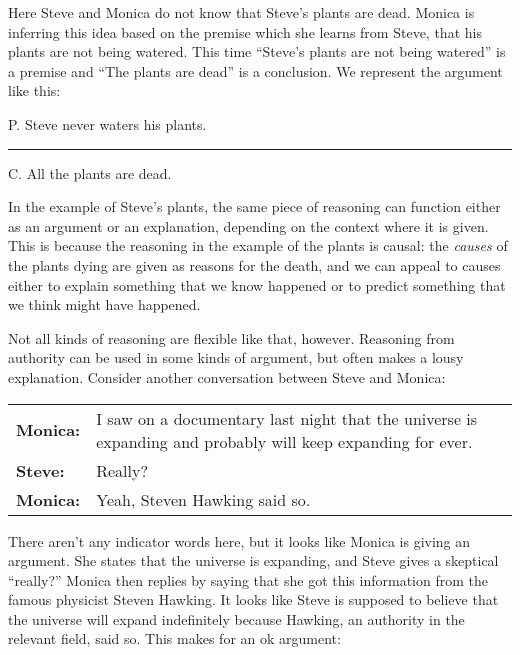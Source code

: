{Here Steve and Monica do not know that Steve's plants are dead. Monica is inferring this idea based on the premise which she learns from Steve, that his plants are not being watered. This time ``Steve's plants are not being watered'' is a premise and ``The plants are dead'' is a conclusion. We represent the argument like this:

\begin{earg}
\item[P.] Steve never waters his plants. 
\vspace{-.5em}
\item [] \rule{0.3\linewidth}{.5pt} 
\item[C.] All the plants are dead. 
\end{earg}

In the example of Steve's plants, the same piece of reasoning can function either as an argument or an explanation, depending on the context where it is given. This is because the reasoning in the example of the plants is causal: the \textit{causes} of the plants dying are given as reasons for the death, and we can appeal to causes either to explain something that we know happened or to predict something that we think might have happened. 

Not all kinds of reasoning are flexible like that, however. Reasoning from authority can be used in some kinds of argument, but often makes a lousy explanation. Consider another conversation between Steve and Monica:

\begin{adjustwidth}{2em}{0em}
\begin{longtabu}{p{.1\linewidth}p{.8\linewidth}}
\textbf{Monica:} & I saw on a documentary last night that the universe is expanding and probably will keep expanding for ever. \\
\textbf{Steve:} & Really?\\
\textbf{Monica:} &Yeah, Steven Hawking said so. \\
\end{longtabu}
\end{adjustwidth}
\vspace{-1cm}

There aren't any indicator words here, but it looks like Monica is giving an argument. She states that the universe is expanding, and Steve gives a skeptical ``really?'' Monica then replies by saying that she got this information from the famous physicist Steven Hawking. It looks like Steve is supposed to believe that the universe will expand indefinitely because Hawking, an authority in the relevant field, said so. This makes for an ok argument: 

}
